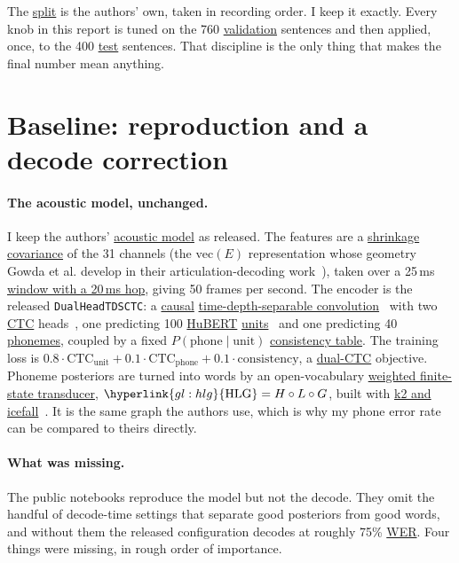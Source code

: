 \documentclass{article}
\DeclareRobustCommand{\glref}[2]{\hyperlink{gl:#1}{\textcolor{glosslink}{#2}}}
\DeclareRobustCommand{\wer}{\glref{wer}{WER}}
\begin{document}
The \glref{split}{split} is the authors' own, taken in recording order. I keep it exactly. Every knob
in this report is tuned on the 760 \glref{val}{validation} sentences and then applied, once, to the
400 \glref{test}{test} sentences. That discipline is the only thing that makes the final number mean
anything.

\section{Baseline: reproduction and a decode correction}
\label{sec:baseline}

\paragraph{The acoustic model, unchanged.}
I keep the authors' \glref{am}{acoustic model} as released. The features are a
\glref{cov}{shrinkage covariance} of the 31 channels (the $\mathrm{vec}(E)$ representation whose
geometry Gowda et al. develop in their articulation-decoding
work~\citep{gowda2024geometry,gowda2025geometric}), taken over a 25\,ms
\glref{frame}{window with a 20\,ms hop}, giving 50 frames per second. The encoder is the released
\texttt{DualHeadTDSCTC}: a \glref{causal}{causal}
\glref{tds}{time-depth-separable convolution}~\citep{hannun2019tds} with two
\glref{ctc}{CTC} heads~\citep{graves2006ctc}, one predicting 100 \glref{hubert}{HuBERT}
\glref{unit}{units}~\citep{hsu2021hubert} and one predicting 40 \glref{phoneme}{phonemes}, coupled by
a fixed $P(\text{phone}\mid\text{unit})$ \glref{consistency}{consistency table}. The training loss is
$0.8\cdot\mathrm{CTC}_{\text{unit}} + 0.1\cdot\mathrm{CTC}_{\text{phone}} +
0.1\cdot\text{consistency}$, a \glref{dualctc}{dual-CTC} objective. Phoneme posteriors are turned into
words by an open-vocabulary \glref{wfst}{weighted finite-state transducer},
$\glref{hlg}{\mathrm{HLG}} = H \circ L \circ G$, built with \glref{k2}{k2 and
icefall}~\citep{k2icefall}. It is the same graph the authors use, which is why my phone error rate can
be compared to theirs directly.

\paragraph{What was missing.}
The public notebooks reproduce the model but not the decode. They omit the handful of decode-time
settings that separate good posteriors from good words, and without them the released configuration
decodes at roughly 75\% \wer{}. Four things were missing, in rough order of importance.
\end{document}
